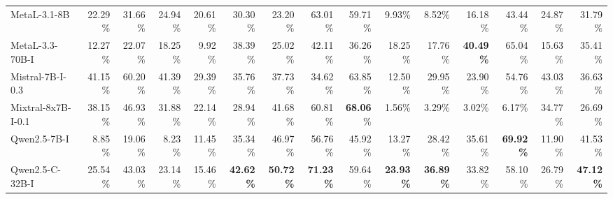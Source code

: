 \documentclass[conference]{IEEEtran}
\begin{document}
\begin{table}[ht]
\begin{tabular}{l*{14}{r}}
    MetaL-3.1-8B        & 22.29\%& 31.66\%& 24.94\%& 20.61\%& 30.30\% & 23.20\% & 63.01\% & 59.71\% & 9.93\%  & 8.52\%  & 16.18\% & 43.44\% & 24.87\% & 31.79\%   \\
    MetaL-3.3-70B-I     & 12.27\%& 22.07\%& 18.25\%& 9.92\% & 38.39\% & 25.02\% & 42.11\% & {36.26\%}& 18.25\% & 17.76\% & \textbf{40.49\%}& 65.04\% & 15.63\% & 35.41\%   \\
    Mistral-7B-I-0.3    & 41.15\%& 60.20\%& 41.39\%& 29.39\%& 35.76\% & 37.73\% & 34.62\% & 63.85\% & 12.50\% & 29.95\% & 23.90\% & 54.76\% & 43.03\% & 36.63\%  \\
    Mixtral-8x7B-I-0.1  & 38.15\%& 46.93\%& 31.88\%& 22.14\%& 28.94\% & {41.68\%}& {60.81\%}& \textbf{68.06}\% & 1.56\%  & 3.29\%  & 3.02\%  & 6.17\%  & 34.77\% & 26.69\%  \\
    Qwen2.5-7B-I        & 8.85\% & 19.06\%& 8.23\% & 11.45\%& 35.34\% & 46.97\% & 56.76\% & 45.92\% & 13.27\% & {28.42\%}& 35.61\% & \textbf{69.92\%} & 11.90\% & 41.53\%  \\
    Qwen2.5-C-32B-I & 25.54\%& 43.03\%& 23.14\%& 15.46\%& \textbf{42.62\%}& \textbf{50.72\%}& \textbf{71.23\%}& 59.64\%& \textbf{23.93\%}& \textbf{36.89\%}& 33.82\% & 58.10\% & 26.79\% & \textbf{47.12\%}  \\
    \bottomrule
  \end{tabular}
\end{table}
\end{document}

